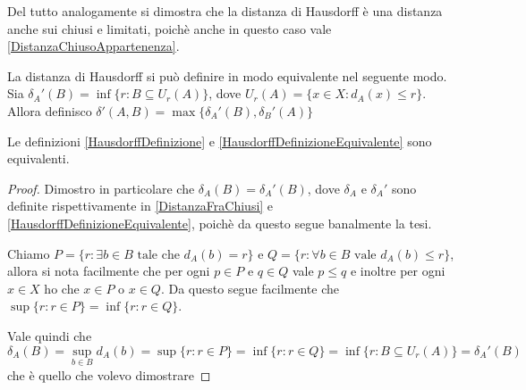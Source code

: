 \begin{remark}
	Del tutto analogamente si dimostra che la distanza di Hausdorff è una distanza anche sui chiusi e limitati, poichè anche in questo caso vale \cref{DistanzaChiusoAppartenenza}.
\end{remark}

\begin{definition} \label{HausdorffDefinizioneEquivalente}
	La distanza di Hausdorff si può definire in modo equivalente nel seguente modo. Sia $\delta_A'(B)=\inf\{r:B\subseteq U_r(A)\}$, dove $U_r(A)=\{x\in X : d_A(x)\le r \}$. Allora definisco $\delta'(A,B)=\max\{\delta_A'(B),\delta_B'(A)\}$
\end{definition}

\begin{theorem}
	Le definizioni \cref{HausdorffDefinizione} e \cref{HausdorffDefinizioneEquivalente} sono equivalenti.
\end{theorem}
\begin{proof}
	Dimostro in particolare che $\delta_A(B)=\delta_A'(B)$, dove $\delta_A$ e $\delta_A'$ sono definite rispettivamente in \cref{DistanzaFraChiusi} e \cref{HausdorffDefinizioneEquivalente}, poichè da questo segue banalmente la tesi.
	
	Chiamo $P=\{ r : \exists b\in B \text{ tale che }d_A(b)=r \}$ e $Q=\{ r: \forall b\in B\text{ vale } d_A(b)\le r \}$, allora si nota facilmente che per ogni $p\in P$ e $q\in Q$ vale $p\le q$ e inoltre per ogni $x\in X$ ho che $x\in P$ o $x\in Q$. Da questo segue facilmente che $\sup\{ r: r\in P \}=\inf\{r: r\in Q \}$.
	
	Vale quindi che
	\begin{equation*}
		\delta_A(B)=\sup_{b\in B} d_A(b)=\sup\{ r : r\in P \}=\inf\{ r : r\in Q \}= \inf\{ r : B\subseteq U_r(A) \}=\delta_A'(B)
	\end{equation*}
	che è quello che volevo dimostrare
\end{proof}

